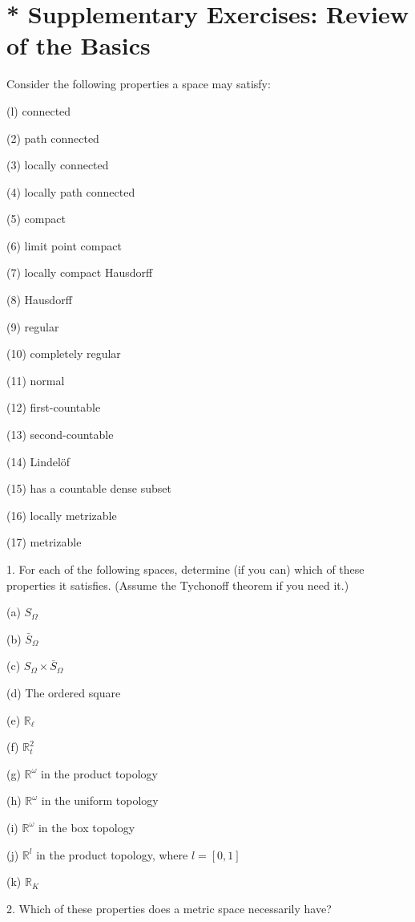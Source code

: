 \section*{* Supplementary Exercises: Review of the Basics}

Consider the following properties a space may satisfy:

(l) connected

(2) path connected

(3) locally connected

(4) locally path connected

(5) compact

(6) limit point compact

(7) locally compact Hausdorff

(8) Hausdorff

(9) regular

(10) completely regular

(11) normal

(12) first-countable

(13) second-countable

(14) Lindelöf

(15) has a countable dense subset

(16) locally metrizable

(17) metrizable

1. For each of the following spaces, determine (if you can) which of these properties it satisfies. (Assume the Tychonoff theorem if you need it.)

(a) \({S}_{\Omega }\)

(b) \({\bar{S}}_{\Omega }\)

(c) \({S}_{\Omega } \times  {\bar{S}}_{\Omega }\)

(d) The ordered square

(e) \({\mathbb{R}}_{\ell }\)

(f) \({\mathbb{R}}_{t}^{2}\)

(g) \({\mathbb{R}}^{\omega }\) in the product topology

(h) \({\mathbb{R}}^{\omega }\) in the uniform topology

(i) \({\mathbb{R}}^{\omega }\) in the box topology

(j) \({\mathbb{R}}^{l}\) in the product topology, where \(l = \left\lbrack  {0,1}\right\rbrack\)

(k) \({\mathbb{R}}_{K}\)

2. Which of these properties does a metric space necessarily have?

